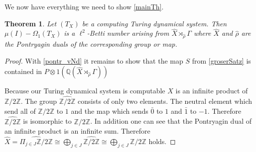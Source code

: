 \documentclass[12pt,a4paper]{scrartcl}
\theoremstyle{plain}
\newtheorem{Theorem}{Theorem}[section]
\theoremstyle{definition}
\numberwithin{equation}{section}
\newcommand{\Q}{\mathbb{Q}} %
\newcommand{\2}{\mathbb{Z} / 2 \mathbb{Z}}
\newcommand{\1}{\bar{1}}
\newcommand{\0}{\bar{0}}
\begin{document}
We now have everything we need to show \ref{mainTh}.
\begin{Theorem}\label{image_of_P}
	Let $(T_X)$ be a computing Turing dynamical system. Then $\mu (I) - \Omega_1(T_X)$ is a $\ell^2$-Betti number arising from $\hat{X} \rtimes_{\hat{\rho}} \Gamma$ where $\hat{X}$ and $\hat{\rho}$ are the Pontryagin duals of the corresponding group or map.
\end{Theorem}
\begin{proof}
	With \ref{pontr_vNd} it remains to show that the map $S$ from \ref{groserSatz} is contained in $P \otimes 1(\Q (\hat{X} \rtimes_{\hat{\rho}} \Gamma))$
	
	Because our Turing dynamical system is computable $X$ is an infinite product of $\2$. The group $\hat{\2}$ consists of only two elements. The neutral element which send all of $\2$ to $1$ and the map which sends $\0$ to $1$ and $\1$ to $-1$. Therefore $\hat{\2}$ is isomorphic to $\2$. In addition one can see  that the Pontryagin dual of an infinite product is an infinite sum. Therefore $\hat{X} = \hat{\Pi_{j \in J} \2} \cong \bigoplus_{j \in J} \hat{\2} \cong \bigoplus_{j \in J} \2$ holds.
		

\end{proof}
\end{document}
